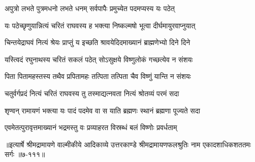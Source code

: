 \twolineshloka
{अपुत्रो लभते पुत्रमधनो लभते धनम्}
{सर्वपापैः प्रमुच्येत पदमप्यस्य यः पठेत्} %

\twolineshloka
{यः पठेच्छृणुयान्नित्यं चरितं राघवस्य ह}
{भक्त्या निष्कल्मषो भूत्वा दीर्घमायुरवाप्नुयात्} %

\twolineshloka
{चिन्तयेद्राघवं नित्यं श्रेयः प्राप्तुं य इच्छति}
{श्रावयेदिदमाख्यानं ब्राह्मणेभ्यो दिने दिने} %

\twolineshloka
{यस्त्विदं रघुनाथस्य चरितं सकलं पठेत्}
{सोऽसुक्षये विष्णुलोकं गच्छत्येव न संशयः} %

\twolineshloka
{पिता पितामहस्तस्य तथैव प्रपितामहः}
{तत्पिता तत्पिता चैव विष्णुं यान्ति न संशयः} %

\twolineshloka
{चतुर्वर्गप्रदं नित्यं चरितं राघवस्य तु}
{तस्माद्यत्नवता नित्यं श्रोतव्यं परमं सदा} %

\twolineshloka
{शृण्वन् रामायणं भक्त्या यः पादं पदमेव वा}
{स याति ब्रह्मणः स्थानं ब्रह्मणा पूज्यते सदा} %

\twolineshloka
{एवमेतत्पुरावृत्तमाख्यानं भद्रमस्तु वः}
{प्रव्याहरत विस्रब्धं बलं विष्णोः प्रवर्धताम्} %


॥इत्यार्षे श्रीमद्रामायणे वाल्मीकीये आदिकाव्ये उत्तरकाण्डे श्रीमद्रामायणफलश्रुतिः नाम एकादशाधिकशततमः सर्गः ॥७-१११॥
